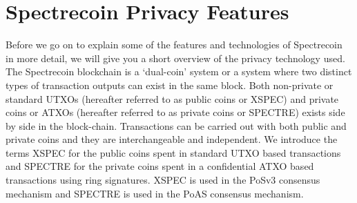\chapter{Spectrecoin Privacy Features}
Before we go on to explain some of the features and technologies of Spectrecoin in more detail, we will give you a short overview of the privacy technology used. The Spectrecoin blockchain is a ‘dual-coin’ system or a system where two distinct types of transaction outputs can exist in the same block. Both non-private or standard UTXOs (hereafter referred to as public coins or XSPEC) and private coins or ATXOs (hereafter referred to as private coins or SPECTRE) exists side by side in the block-chain. Transactions can be carried out with both public and private coins and they are interchangeable and independent. We introduce the terms XSPEC for the public coins spent in standard UTXO based transactions and SPECTRE for the private coins spent in a confidential ATXO based transactions using ring signatures. XSPEC is used in the PoSv3 consensus mechanism and SPECTRE is used in the PoAS consensus mechanism. 